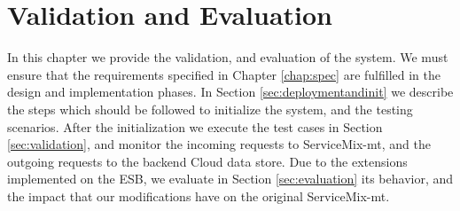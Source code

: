 \chapter{Validation and Evaluation}
\label{chap:validationevaluation}


In this chapter we provide the validation, and evaluation of the system. We must ensure that the requirements specified in Chapter \ref{chap:spec} are fulfilled in the design and implementation phases. In Section \ref{sec:deploymentandinit} we describe the steps which should be followed to initialize the system, and the testing scenarios. After the initialization we execute the test cases in Section \ref{sec:validation}, and monitor the incoming requests to ServiceMix-mt, and the outgoing requests to the backend Cloud data store. Due to the extensions implemented on the \ac{ESB}, we evaluate in Section \ref{sec:evaluation} its behavior, and the impact that our modifications have on the original ServiceMix-mt.




